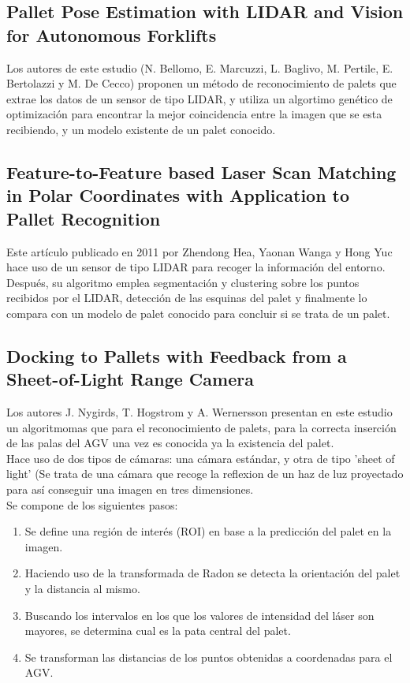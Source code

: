 \subsection{Pallet Pose Estimation with LIDAR and Vision for Autonomous Forklifts}
Los autores de este estudio (N. Bellomo, E. Marcuzzi, L. Baglivo, M. Pertile, E. Bertolazzi y M. De Cecco) proponen un método de reconocimiento de palets que extrae los datos de un sensor de tipo LIDAR, y utiliza un algortimo genético de optimización para encontrar la mejor coincidencia entre la imagen que se esta recibiendo, y un modelo existente de un palet conocido.

\subsection{Feature-to-Feature based Laser Scan Matching in Polar Coordinates with Application to Pallet Recognition}
Este artículo publicado en 2011 por Zhendong Hea, Yaonan Wanga y Hong Yuc hace uso de un sensor de tipo LIDAR para recoger la información del entorno.
Después, su algoritmo emplea segmentación y clustering sobre los puntos recibidos por el LIDAR, detección de las esquinas del palet y finalmente lo compara con un modelo de palet conocido para concluir si se trata de un palet.

\subsection{Docking to Pallets with Feedback from a Sheet-of-Light Range Camera
}
Los autores J. Nygirds, T. Hogstrom y A. Wernersson presentan en este estudio un algoritmomas que para el reconocimiento de palets, para la correcta inserción de las palas del AGV una vez es conocida ya la existencia del palet. \\ Hace uso de dos tipos de cámaras: una cámara estándar, y otra de tipo 'sheet of light' (Se trata de una cámara que recoge la reflexion de un haz de luz proyectado para así conseguir una imagen en tres dimensiones.\\
Se compone de los siguientes pasos:
\begin{enumerate}

\item Se define una región de interés (ROI) en base a la predicción del palet en la imagen.
\item Haciendo uso de la transformada de Radon se detecta la orientación del palet y la distancia al mismo.
\item Buscando los intervalos en los que los valores de intensidad del láser son mayores, se determina cual es la pata central del palet.
\item Se transforman las distancias de los puntos obtenidas a coordenadas para el AGV.
\end{enumerate}


